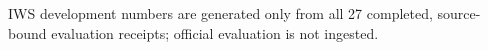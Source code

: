 IWS development numbers are generated only from all 27 completed, source-bound evaluation receipts; official evaluation is not ingested.

